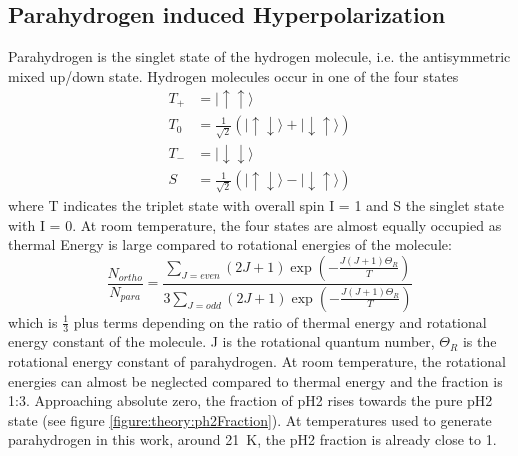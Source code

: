        \subsection{Parahydrogen induced Hyperpolarization}
            Parahydrogen is the singlet state of the hydrogen molecule, i.e. the antisymmetric mixed up/down state. Hydrogen molecules occur in one of the four states
            \begin{equation}
                 \begin{aligned}
                    T_+ &= |\uparrow\uparrow\rangle\\
                    T_0 &= \frac{1}{\sqrt{2}}\left(|\uparrow\downarrow\rangle + |\downarrow\uparrow\rangle\right)\\
                    T_- &= |\downarrow\downarrow\rangle\\
                    S &= \frac{1}{\sqrt{2}}\left(|\uparrow\downarrow\rangle - |\downarrow\uparrow\rangle\right)
                 \end{aligned}
            \end{equation}
            where T indicates the triplet state with overall spin I = 1 and S the singlet state with I = 0. At room temperature, the four states are almost equally occupied as thermal Energy is large compared to rotational energies of the molecule\cite{green_theory_2012-1}:
            \begin{equation}
                \frac{N_{ortho}}{N_{para}} = \frac{\sum_{J=even}(2J+1)\exp\left(-\frac{J(J+1)\Theta_R}{T}\right)}{3\sum_{J=odd}\left(2J+1\right)\exp\left(-\frac{J(J+1)\Theta_R}{T}\right)}
            \end{equation}
            which is $\tfrac{1}{3}$ plus terms depending on the ratio of thermal energy and rotational energy constant of the molecule. J is the rotational quantum number, $\Theta_R$ is the rotational energy constant of parahydrogen\cite{noauthor_orthohydrogen_1935}. At room temperature, the rotational energies can almost be neglected compared to thermal energy and the fraction is 1:3. Approaching absolute zero, the fraction of pH2 rises towards the pure pH2 state (see figure \ref{figure:theory:ph2Fraction}). At temperatures used to generate parahydrogen in this work, around \SI{21}{\kelvin}, the pH2 fraction is already close to 1.
